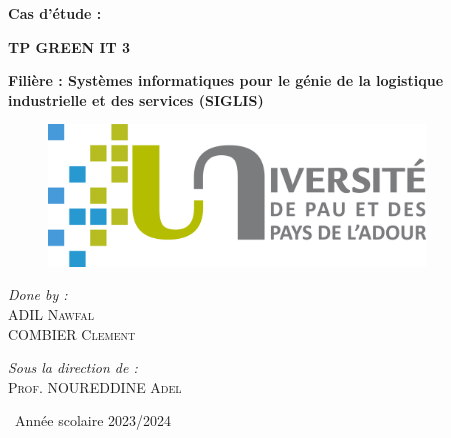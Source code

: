 \documentclass[12pt, a4paper]{report}
\begin{document}
\begin{titlepage}

	
	\begin{center}
		
		{ \Huge \bfseries Cas d'étude :}
  
		\vspace{1cm}
  
        {\bfseries\Huge TP GREEN IT 3}
		
		
		\vspace*{1cm}

        \hfill

	    
		\Large \textbf{Filière : Systèmes informatiques pour le génie de la logistique industrielle et des services (SIGLIS)}\\

        \vspace{2cm}

       
  
  
        \begin{figure}[H]
        \centering
            \includegraphics[width=10cm]{uppa.png}
        \end{figure}



        \end{center}

\vspace{3cm}


\begin{minipage}{0.4\textwidth}
\begin{flushleft} \large
\emph{Done by :}\\[0.5 cm]
ADIL \textsc{Nawfal}\\
COMBIER \textsc{Clement}\\

\end{flushleft}
\end{minipage}
\hfill
\begin{minipage}{0.5\textwidth}
\begin{flushright} \large
\emph{Sous la direction de :} \\[0.5 cm]
\textsc{Prof. NOUREDDINE \textsc{Adel}}\\

\end{flushright}
\end{minipage}

\vfill

\begin{center}
{\large \ Année scolaire 2023/2024}
\end{center}
	
	\restoregeometry
	
\end{titlepage}
\end{document}
